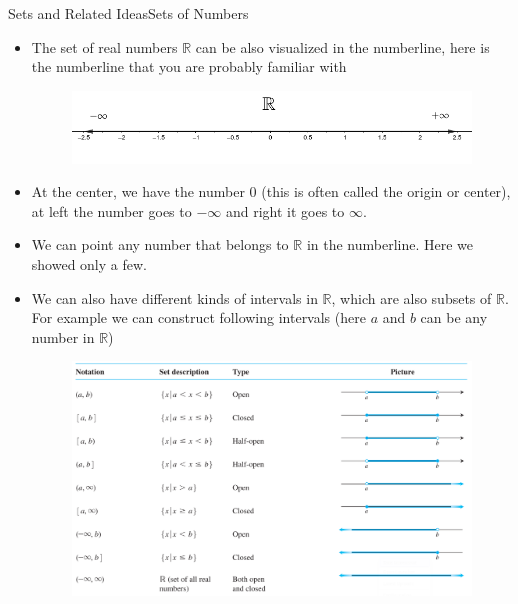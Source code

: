 \documentclass[8pt,usepdftitle=false]{beamer}
\begin{document}
\begin{frame}[allowframebreaks]{Sets and Related Ideas}{Sets of Numbers}
\begin{itemize}
\begin{itemize}
\medskip

\item This means we can write $\mathbb{N} \subsetneq \mathbb{Z} \subsetneq \mathbb{Q} \subsetneq \mathbb{R}$



\end{itemize} 




\item The set of real numbers $\mathbb{R}$ can be also visualized in the numberline, here is the numberline that you are probably familiar with

\vspace*{.3cm}
\begin{figure}
\includegraphics[scale = .5]{Images/x_axis.png}
\end{figure}

\item At the center, we have the number $0$ (this is often called the origin or center), at left the number goes to $-\infty$ and right it goes to $\infty$.

\item We can point any number that belongs to $\mathbb{R}$ in the numberline. Here we showed only a few.






\item We can also have different kinds of intervals in $\mathbb{R}$, which are also subsets of $\mathbb{R}$. For example we can construct following intervals (here $a$ and $b$ can be any number in $\mathbb{R}$)
\vspace*{.2cm}


\begin{figure}
\includegraphics[scale = .28]{Images/Intervals2.png}
\end{figure}


\end{itemize}
\end{frame}
\end{document}
